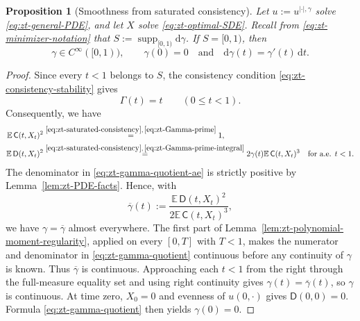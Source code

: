 \documentclass[10pt]{amsart}
\newtheorem{proposition}[proposition]{Proposition}
\theoremstyle{definition}
\theoremstyle{remark}
\numberwithin{equation}{section}
\newcommand{\E}{\mathbb E}
\newcommand{\1}{\mathbf 1}
\newcommand{\supp}{\operatorname{supp}}
\newcommand{\dd}{\,\mathrm d}
\newcommand{\stackref}[2]{\stackrel{#2}{#1}}
\begin{document}
\begin{proposition}[Smoothness from saturated consistency]
\label{prop:zt-smoothness}
Let $u:=u^{|\cdot|,\gamma}$ solve \eqref{eq:zt-general-PDE}, and let $X$ solve \eqref{eq:zt-optimal-SDE}. Recall from \eqref{eq:zt-minimizer-notation} that $S:=\supp_{[0,1)}\mathrm d\gamma$. If $S=[0,1)$, then
\begin{equation}
 \gamma\in C^\infty([0,1)),
 \qquad
 \gamma(0)=0
 \quad\text{and}\quad
 \mathrm d\gamma(t)=\gamma'(t)\dd t.
 \label{eq:zt-smoothness-conclusion}
\end{equation}
\end{proposition}

\begin{proof}
Since every $t<1$ belongs to $S$, the consistency condition \eqref{eq:zt-consistency-stability} gives
\begin{equation}
 \Gamma(t)=t\qquad(0\leq t<1).
 \label{eq:zt-saturated-consistency}
\end{equation}
Consequently, we have
\begin{align}
 \E\,\mathsf C(t,X_t)^2
 &\stackref{=}{\eqref{eq:zt-saturated-consistency},\,\eqref{eq:zt-Gamma-prime}}1,                                             \label{eq:zt-C-second-moment-one}\\
 \E\,\mathsf D(t,X_t)^2
 &\stackref{=}{\eqref{eq:zt-saturated-consistency},\,\eqref{eq:zt-Gamma-prime-integral}}
 2\gamma(t)\E\,\mathsf C(t,X_t)^3
 \quad\text{for a.e. }t<1.                                   \label{eq:zt-gamma-quotient-ae}
\end{align}
The denominator in \eqref{eq:zt-gamma-quotient-ae} is strictly positive by Lemma~\ref{lem:zt-PDE-facts}.  Hence, with
\begin{equation}
 \overline\gamma(t)
 :=\frac{\E\,\mathsf D(t,X_t)^2}{2\E\,\mathsf C(t,X_t)^3},
 \label{eq:zt-gamma-quotient}
\end{equation}
we have $\gamma=\overline\gamma$ almost everywhere. The first part of Lemma~\ref{lem:zt-polynomial-moment-regularity}, applied on every $[0,T]$ with $T<1$, makes the numerator and denominator in \eqref{eq:zt-gamma-quotient} continuous before any continuity of $\gamma$ is known. Thus $\overline\gamma$ is continuous. Approaching each $t<1$ from the right through the full-measure equality set and using right continuity gives $\gamma(t)=\overline\gamma(t)$, so $\gamma$ is continuous. At time zero, $X_0=0$ and evenness of $u(0,\cdot)$ gives $\mathsf D(0,0)=0$. Formula \eqref{eq:zt-gamma-quotient} then yields $\gamma(0)=0$.


\end{proof}
\end{document}
